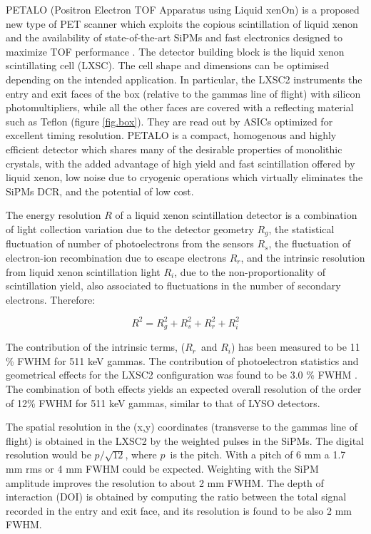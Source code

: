 \documentclass[review]{elsarticle}
\begin{document}
PETALO (Positron Electron TOF Apparatus using Liquid xenOn) is a proposed new type of PET scanner which exploits the copious scintillation of liquid xenon and the availability of state-of-the-art SiPMs and fast electronics designed to maximize TOF performance \cite{Petalo2015}. The detector building block is the liquid xenon scintillating cell (LXSC). The cell shape and dimensions can be optimised depending on the intended application. In particular, the LXSC2 instruments the entry and exit faces of the box (relative to the gammas line of flight) with silicon photomultipliers, while all the other faces are covered with a reflecting material such as Teflon (figure \ref{fig.box}). They are read out by ASICs optimized for excellent timing resolution. PETALO is a compact, homogenous and highly efficient detector which shares many of the desirable properties of monolithic crystals, with the added advantage of high yield and fast scintillation offered by liquid xenon, low noise due to cryogenic operations which virtually eliminates the SiPMs DCR, and the potential of low cost. 

The energy resolution $R$ of a liquid xenon scintillation detector is a combination of light collection variation due to the detector geometry $R_g$, the statistical fluctuation of number of photoelectrons from the sensors $R_s$, the fluctuation of electron-ion recombination due to escape electrons $R_r$, and the intrinsic resolution from liquid xenon scintillation light $R_i$, due to the non-proportionality of scintillation yield, also associated to fluctuations in the number of secondary electrons. Therefore:

\begin{equation}
R^2 = R_g^2 + R_s^2 + R_r^2 + R_i^2
\end{equation}

The contribution of the intrinsic terms, ($R_r$~and $R_i$) has been measured to be 11 \% FWHM \cite{aprileRes} for 511 keV gammas. The contribution of photoelectron statistics and geometrical effects for the LXSC2 configuration was found to be 3.0 \% FWHM \cite{Petalo2015}. The combination of both effects yields an expected 
overall resolution of the order of 12\% FWHM for 511 keV gammas, similar to that of LYSO detectors. 

The spatial resolution in the (x,y) coordinates (transverse to the gammas line of flight) is obtained in the LXSC2 by the weighted pulses in the SiPMs. The digital resolution would be
$p/\sqrt{12}$, where $p$~is the pitch. With a pitch of 6 mm a 1.7 mm rms or 4 mm FWHM could be expected. Weighting with the SiPM amplitude improves the resolution to about 2 mm FWHM. The depth of interaction (DOI) is obtained by computing the ratio between the
total signal recorded in the entry and exit face, and its resolution is found to be also 2 mm FWHM. 
\end{document}
